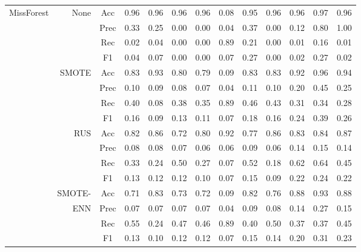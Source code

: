 \begin{table*}
\begin{narrow}{-1cm}{-1cm}
\begin{subtable}[t]{2.05\columnwidth}
\begin{tabular}{l|r|c|cccccccccc}
        MissForest & None & Acc & 0.96 & 0.96 & 0.96 & 0.96 & 0.08 & 0.95 & 0.96 & 0.96 & 0.97 & 0.96 \\
        ~ & ~ & Prec & 0.33 & 0.25 & 0.00 & 0.00 & 0.04 & 0.37 & 0.00 & 0.12 & 0.80 & 1.00 \\
        ~ & ~ & Rec & 0.02 & 0.04 & 0.00 & 0.00 & 0.89 & 0.21 & 0.00 & 0.01 & 0.16 & 0.01 \\
        ~ & ~ & F1 & 0.04 & 0.07 & 0.00 & 0.00 & 0.07 & 0.27 & 0.00 & 0.02 & 0.27 & 0.02 \\
        \cline{2-13}
        ~ & SMOTE & Acc & 0.83 & 0.93 & 0.80 & 0.79 & 0.09 & 0.83 & 0.83 & 0.92 & 0.96 & 0.94 \\
        ~ & ~ & Prec & 0.10 & 0.09 & 0.08 & 0.07 & 0.04 & 0.11 & 0.10 & 0.20 & 0.45 & 0.25 \\
        ~ & ~ & Rec & 0.40 & 0.08 & 0.38 & 0.35 & 0.89 & 0.46 & 0.43 & 0.31 & 0.34 & 0.28 \\
        ~ & ~ & F1 & 0.16 & 0.09 & 0.13 & 0.11 & 0.07 & 0.18 & 0.16 & 0.24 & 0.39 & 0.26 \\
        \cline{2-13}
        ~ & RUS & Acc & 0.82 & 0.86 & 0.72 & 0.80 & 0.92 & 0.77 & 0.86 & 0.83 & 0.84 & 0.87 \\
        ~ & ~ & Prec & 0.08 & 0.08 & 0.07 & 0.06 & 0.06 & 0.09 & 0.06 & 0.14 & 0.15 & 0.14 \\
        ~ & ~ & Rec & 0.33 & 0.24 & 0.50 & 0.27 & 0.07 & 0.52 & 0.18 & 0.62 & 0.64 & 0.45 \\
        ~ & ~ & F1 & 0.13 & 0.12 & 0.12 & 0.10 & 0.07 & 0.15 & 0.09 & 0.22 & 0.24 & 0.22 \\
        \cline{2-13}
        ~ & SMOTE- & Acc & 0.71 & 0.83 & 0.73 & 0.72 & 0.09 & 0.82 & 0.76 & 0.88 & 0.93 & 0.88 \\
        ~ & ENN & Prec & 0.07 & 0.07 & 0.07 & 0.07 & 0.04 & 0.09 & 0.08 & 0.14 & 0.27 & 0.15 \\
        ~ & ~ & Rec & 0.55 & 0.24 & 0.47 & 0.46 & 0.89 & 0.40 & 0.50 & 0.37 & 0.37 & 0.45 \\
        ~ & ~ & F1 & 0.13 & 0.10 & 0.12 & 0.12 & 0.07 & 0.15 & 0.14 & 0.20 & 0.31 & 0.23 \\
        \hline\hline
        

\end{tabular}
\end{subtable}
\end{narrow}
\end{table*}
